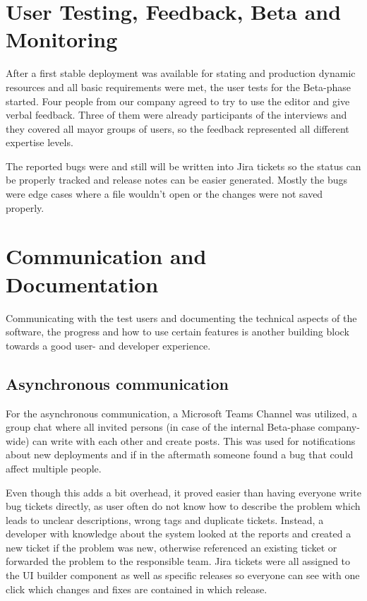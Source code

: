 \section{User Testing, Feedback, Beta and Monitoring}

After a first stable deployment was available for stating and production dynamic resources and all basic requirements were met, the user tests for the Beta-phase started.
Four people from our company agreed to try to use the editor and give verbal feedback. Three of them were already participants of the interviews and they covered all mayor groups of users,
so the feedback represented all different expertise levels.

The reported bugs were and still will be written into Jira tickets so the status can be properly tracked and release notes can be easier generated.
Mostly the bugs were edge cases where a file wouldn't open or the changes were not saved properly.


\section{Communication and Documentation}
Communicating with the test users and documenting the technical aspects of the software, the progress and how to use certain features is
another building block towards a good user- and developer experience.
\subsection{Asynchronous communication}
For the asynchronous communication, a Microsoft Teams Channel was utilized, a group chat where all invited persons (in case of the internal Beta-phase company-wide) can write with each other and create posts.
This was used for notifications about new deployments and if in the aftermath someone found a bug that could affect multiple people.

Even though this adds a bit overhead, it proved easier than having everyone write bug tickets directly, as user often do not know how to describe the problem which leads to unclear descriptions, wrong tags and duplicate tickets.
Instead, a developer with knowledge about the system looked at the reports and created a new ticket if the problem was new, otherwise referenced an existing ticket or forwarded the problem to the responsible team.
Jira tickets were all assigned to the UI builder component as well as specific releases so everyone can see with one click which changes and fixes are contained in which release.

